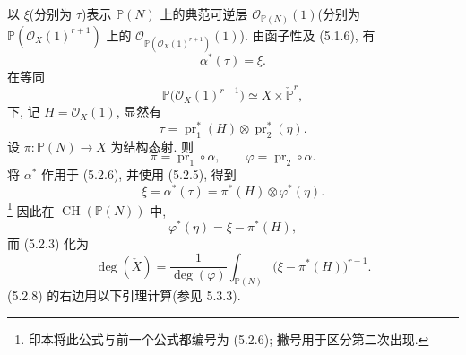 以 $\xi$(分别为 $\tau$)表示 $\mathbb P(N)$ 上的典范可逆层 $\mathcal O_{\mathbb P(N)}(1)$(分别为 $\mathbb P(\mathcal O_X(1)^{r+1})$ 上的 $\mathcal O_{\mathbb P(\mathcal O_X(1)^{r+1})}(1)$). 由函子性及 (5.1.6), 有
\begin{equation}\tag{5.2.5}
\alpha^*(\tau)=\xi.
\end{equation}
在等同
\[
\mathbb P\bigl(\mathcal O_X(1)^{r+1}\bigr)
\simeq X\times\check{\mathbb P}^{r},
\]
下, 记 $H=\mathcal O_X(1)$, 显然有
\begin{equation}\tag{5.2.6}
\tau=\operatorname{pr}_1^*(H)\otimes\operatorname{pr}_2^*(\eta).
\end{equation}
设 $\pi:\mathbb P(N)\to X$ 为结构态射. 则
\[
\pi=\operatorname{pr}_1\circ\alpha,
\qquad
\varphi=\operatorname{pr}_2\circ\alpha.
\]
将 $\alpha^*$ 作用于 (5.2.6), 并使用 (5.2.5), 得到
\begin{equation}\tag{5.2.6$'$}
\xi=\alpha^*(\tau)=\pi^*(H)\otimes\varphi^*(\eta).
\end{equation}
\footnote{印本将此公式与前一个公式都编号为 (5.2.6); 撇号用于区分第二次出现.}
因此在 $\operatorname{CH}(\mathbb P(N))$ 中,
\begin{equation}\tag{5.2.7}
\varphi^*(\eta)=\xi-\pi^*(H),
\end{equation}
而 (5.2.3) 化为
\begin{equation}\tag{5.2.8}
\deg(\check X)
=\frac{1}{\deg(\varphi)}
\int_{\mathbb P(N)}\bigl(\xi-\pi^*(H)\bigr)^{r-1}.
\end{equation}
(5.2.8) 的右边用以下引理计算(参见 5.3.3).